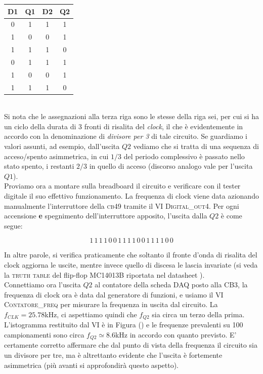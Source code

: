 \documentclass[journal, a4paper]{IEEEtran}
\begin{document}
\begin{table}[h]
\centering
\begin{tabular}{c|c||c|c}
\hline \textbf{D1} & \textbf{Q1} & \textbf{D2} & \textbf{Q2} \\ 
\hline 0 & 1 & 1 & 1 \\ 
 1 & 0 & 0 & 1 \\
 1 & 1 & 1 & 0 \\ 
 0 & 1 & 1 & 1 \\ 
 1 & 0 & 0 & 1 \\
 1 & 1 & 1 & 0 \\
 
\hline
 
\end{tabular} 
\end{table}
~\\

Si nota che le assegnazioni alla terza riga sono le stesse della riga sei, per cui si ha un ciclo della durata di 3 fronti di risalita del \textit{clock}, il che è evidentemente in accordo con la denominazione di \textit{divisore per 3} di tale circuito. Se guardiamo i valori assunti, ad esempio, dall'uscita $Q2$ vediamo che si tratta di una sequenza di acceso/spento asimmetrica, in cui $1/3$ del periodo complessivo è passato nello stato spento, i restanti $2/3$ in quello di acceso (discorso analogo vale per l'uscita $Q1$).\\
Proviamo ora a montare sulla breadboard il circuito e verificare con il tester digitale il suo effettivo funzionamento. La frequenza di clock viene data azionando manualmente l'interruttore della \textsc{cb49} tramite il VI \textsc{Digital\_out4}. Per ogni accensione \textbf{e} spegnimento dell'interruttore apposito, l'uscita dalla $Q2$ è come segue:

\begin{equation}
1\,1\,1\,1\,0\,0\,1\,1\,1\,1\,0\,0\,1\,1\,1\,1\,0\,0
\end{equation}

In altre parole, si verifica praticamente che soltanto il fronte d'onda di risalita del clock aggiorna le uscite, mentre invece quello di discesa le lascia invariate (si veda la \textsc{truth table} del flip-flop MC14013B riportata nel datasheet \cite{M06}).\\
Connettiamo ora l'uscita $Q2$ al contatore della scheda DAQ posto alla \textsc{CB3}, la frequenza di clock ora è data dal generatore di funzioni, e usiamo il VI \textsc{Contatore\_freq} per misurare la frequenza in uscita dal circuito. La $f_{CLK} = 25.78$kHz, ci aspettiamo quindi che $f_{Q2}$ sia circa un terzo della prima. L'istogramma restituito dal VI è in Figura () e le frequenze prevalenti su 100 campionamenti sono circa $f_{Q2} \simeq $8.6kHz in accordo con quanto previsto. E' certamente corretto affermare che dal punto di vista della frequenza il circuito sia un divisore per tre, ma è altrettanto evidente che l'uscita è fortemente asimmetrica (più avanti si approfondirà questo aspetto).\\
\end{document}
